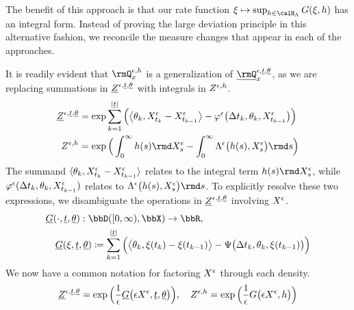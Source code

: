 The benefit of this approach is that our rate function $\pathVar \mapsto \sup_{\twistFunc\in\twistSpace} \mgRf(\pathVar, \twistFunc)$ has an integral form.
Instead of proving the large deviation principle in this alternative fashion, we reconcile the measure changes that appear in each of the approaches.

It is readily evident that $\mgPrb^{\epsilon,\twistFunc}_\stateVar$ is a generalization of $\fddPrb^{\epsilon,\underline t,\underline\twistVar}_\stateVar$, as we are replacing summations in $\underline{Z}^{\epsilon, \underline t, \underline{\theta}}$ with integrals in $Z^{\epsilon,h}$.
\begin{equation}
  \label{eq:densities-side-by-side}
  \begin{aligned}
    \fddDensity^{\epsilon, \underline t, \underline\twistVar} 
    &= \exp \sum_{k=1}^{|\underline t|}\Big( \bprj{\twistVar_k}{\Xee_{t_k}-\Xee_{t_{k-1}}} - \affShift^\epsilon\big(\Delta t_k, \twistVar_k, \Xee_{t_{k-1}} \big) \Big) \\
    \mgDensity^{\epsilon, \twistFunc}
    &= \exp\Big( \int_0^\infty \twistFunc(s) \rmd \Xee_s - \int_0^\infty \ode^\epsilon\big(\twistFunc(s), \Xee_s\big) \rmd s \Big)
  \end{aligned}
\end{equation}
The summand ${\langle \theta_k , X^\epsilon_{t_k}-X^\epsilon_{t_{k-1}} \rangle}$ relates to the integral term $\twistFunc(s) \rmd \Xee_s$, while $\varphi^\epsilon(\Delta t_k, \theta_k, X^\epsilon_{t_{k-1}})$ relates to $\ode^\epsilon\big(\twistFunc(s), \Xee_s\big)\rmd s$.
To explicitly resolve these two expressions, we disambiguate the operations in $\underline{Z}^{\epsilon,\underline t, \underline{\theta}}$ involving $X^\epsilon$.
\begin{equation*}
  \begin{aligned}[t]
    &\fddRf(\cdot,\underline t, \underline\twistVar): \pathSpace{[0,\infty)}{\stateSpace} \rightarrow \bbR, \\
    &\quad \fddRf(\pathVar,\underline t, \underline\twistVar) \defeq \sum_{k=1}^{|\underline t|} \Big( \bprj{\twistVar_k}{\pathVar(t_k)-\pathVar(t_{k-1})} - \aff\big(\Delta t_k, \twistVar_k, \pathVar(t_{k-1})\big) \Big)
  \end{aligned}
\end{equation*}
We now have a common notation for factoring $X^\epsilon$ through each density.
\begin{equation*}
  \underline{Z}^{\epsilon, \underline t, \underline{\theta}} = \exp\Big( \frac1\epsilon \underline{G}\big(\epsilon X^\epsilon, \underline t, \underline{\theta}\big) \Big), \quad
  Z^{\epsilon, h} = \exp\Big( \frac1\epsilon G\big(\epsilon X^\epsilon, h\big) \Big)
\end{equation*}
